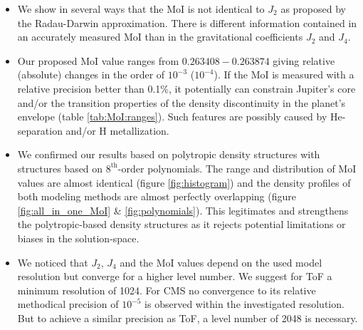 \documentclass[usenatbib]{mnras}
\begin{document}
\noindent

\begin{itemize}[
  align=left,
  leftmargin=1.4em,
  itemindent=0pt,
  labelsep=0pt,
  labelwidth=1.4em
]
\item We show in several ways that the MoI is not identical to $J_2$ as proposed by the Radau-Darwin approximation. There is different information contained in an accurately measured MoI than in the gravitational coefficients $J_2$ and $J_4$. 

\item Our proposed MoI value ranges from $0.263408 - 0.263874$ giving relative (absolute) changes in the order of $10^{-3}$ ($10^{-4}$).
If the MoI is measured with a relative precision better than 0.1\%, it potentially can constrain Jupiter's core and/or the transition properties of the density discontinuity in the planet's envelope (table \ref{tab:MoI:ranges}). Such features are possibly caused by He-separation and/or H metallization.

\item We confirmed our results based on polytropic density structures with structures based on $8^{\text{th}}$-order polynomials. 
The range and distribution of MoI values are almost identical (figure \ref{fig:histogram}) and the density profiles of both modeling methods are almost perfectly overlapping (figure \ref{fig:all_in_one_MoI} \& \ref{fig:polynomials}). 
This legitimates and strengthens the polytropic-based density structures as it rejects potential limitations or biases in the solution-space. 

\item %
We noticed that $J_2$, $J_4$ and the MoI values depend on the used model resolution but converge for a higher level number. We suggest for ToF a minimum resolution of 1024. For CMS no convergence to its relative methodical precision of $10^{-5}$ is observed within the investigated resolution. But to achieve a similar precision as ToF, a level number of 2048 is necessary.


\end{itemize}
\end{document}
